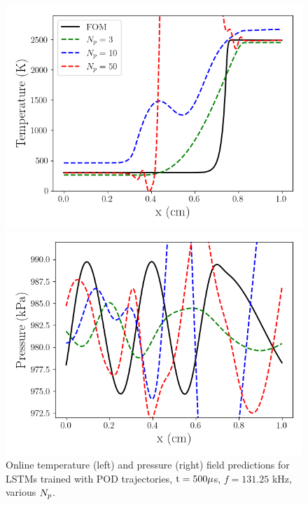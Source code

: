 \begin{figure}
    \begin{minipage}{0.49\linewidth}
        \includegraphics[width=0.99\linewidth]{Chapters/TransientFlame/Images/lstm/pod_rom_temp_snaps.png}
    \end{minipage}
    \begin{minipage}{0.49\linewidth}
        \includegraphics[width=0.99\linewidth]{Chapters/TransientFlame/Images/lstm/pod_rom_press_snaps.png}
    \end{minipage}
    \caption{\label{fig:flamePODLSTMFields}Online temperature (left) and pressure (right) field predictions for LSTMs trained with POD trajectories, $\text{t} = 500 \mu$s, $f = 131.25$ kHz, various $N_p$.}
\end{figure}


